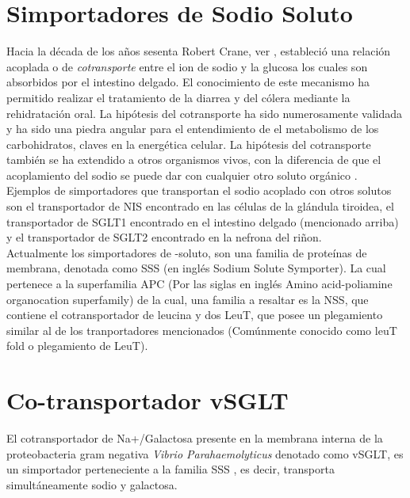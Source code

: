 \section{Simportadores de Sodio Soluto}
Hacia la d\'{e}cada de los a\~{n}os sesenta Robert Crane, ver \cite{Hamilton2013}, estableci\'{o} una relaci\'{o}n acoplada o de \textit{cotransporte} entre el ion de sodio y la glucosa los cuales son absorbidos por el intestino delgado. El conocimiento de este mecanismo ha permitido realizar el tratamiento de la diarrea y del c\'{o}lera mediante la rehidrataci\'{o}n oral. La hip\'{o}tesis del cotransporte ha sido numerosamente validada y ha sido una piedra angular para el entendimiento de el metabolismo de los carbohidratos, claves en la energ\'{e}tica celular. La hip\'{o}tesis del cotransporte tambi\'{e}n se ha extendido a otros organismos vivos, con la diferencia de que el acoplamiento del sodio se puede dar con cualquier otro soluto org\'{a}nico \cite{Faham2008}.\\

Ejemplos de simportadores que transportan el sodio acoplado con otros solutos son el transportador de  NIS encontrado en las c\'{e}lulas de la gl\'{a}ndula tiroidea, el transportador de   SGLT1 encontrado en el intestino delgado (mencionado arriba) y el transportador de   SGLT2 encontrado en la nefrona del ri\~{n}on.\\ 

Actualmente los simportadores de -soluto, son una familia de prote\'{i}nas de membrana, denotada como SSS (en ingl\'{e}s Sodium Solute Symporter). La cual pertenece a la superfamilia APC (Por las siglas en ingl\'{e}s Amino acid-poliamine organocation superfamily) de la cual, una familia a resaltar es la NSS, que contiene el cotransportador de leucina y dos  LeuT, que posee un plegamiento similar al de los tranportadores mencionados (Com\'{u}nmente conocido como leuT fold o plegamiento de LeuT).\\
\section{Co-transportador vSGLT}\label{sec:esvSGLT}
El cotransportador de Na+/Galactosa presente en la membrana interna de la proteobacteria gram negativa \textit{Vibrio Parahaemolyticus} denotado como vSGLT, es un simportador perteneciente a la familia  SSS \cite{SaierJr.}, es decir, transporta simult\'{a}neamente sodio y galactosa.\\

